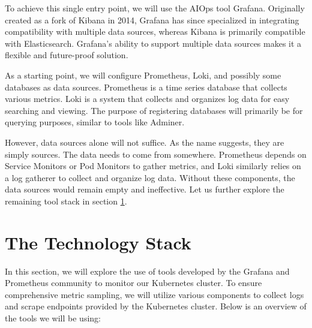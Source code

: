 To achieve this single entry point, we will use the AIOps tool Grafana. Originally created as a fork of Kibana in 2014, Grafana has since specialized in integrating compatibility with multiple data sources, whereas Kibana is primarily compatible with Elasticsearch. Grafana's ability to support multiple data sources makes it a flexible and future-proof solution.

As a starting point, we will configure Prometheus, Loki, and possibly some databases as data sources. Prometheus is a time series database that collects various metrics. Loki is a system that collects and organizes log data for easy searching and viewing. The purpose of registering databases will primarily be for querying purposes, similar to tools like Adminer.

However, data sources alone will not suffice. As the name suggests, they are simply sources. The data needs to come from somewhere. Prometheus depends on Service Monitors or Pod Monitors to gather metrics, and Loki similarly relies on a log gatherer to collect and organize log data. Without these components, the data sources would remain empty and ineffective. Let us further explore the remaining tool stack in section \ref{sec:monitoring_stack}.

\section{The Technology Stack}\label{sec:monitoring_stack}
In this section, we will explore the use of tools developed by the Grafana and Prometheus community to monitor our Kubernetes cluster. To ensure comprehensive metric sampling, we will utilize various components to collect logs and scrape endpoints provided by the Kubernetes cluster. Below is an overview of the tools we will be using:

